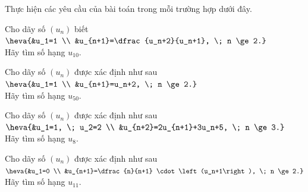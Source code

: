\begin{ex}%
	Thực hiện các yêu cầu của bài toán trong mỗi trường hợp dưới đây. 
	\begin{listEX}[1]
		\item Cho dãy số $(u_n)$ biết $\heva{&u_1=1 \\ &u_{n+1}=\dfrac{u_n+2}{u_n+1}, \; n \ge  2.}$ \\
		Hãy tìm số  hạng $u_{10}$.
		\item Cho dãy số $(u_n)$ được xác định  như sau $\heva{&u_1=1 \\ &u_{n+1}=u_n+2, \; n \ge 2.}$ \\
		Hãy tìm  số hạng $u_{50}$.
		\item Cho dãy  số $(u_n)$ được xác định như sau $\heva{&u_1=1, \; u_2=2 \\ &u_{n+2}=2u_{n+1}+3u_n+5, \; n \ge 3.}$ \\
		Hãy tìm số hạng  $u_8$.
		\item Cho dãy số $(u_n)$ được xác định như sau $\heva{&u_1=0 \\ &u_{n+1}=\dfrac{n}{n+1} \cdot \left(u_n+1\right),  \; n \ge 2.}$ \\
		Hãy  tìm số hạng $u_{11}$.
	\end{listEX}
\end{ex}
